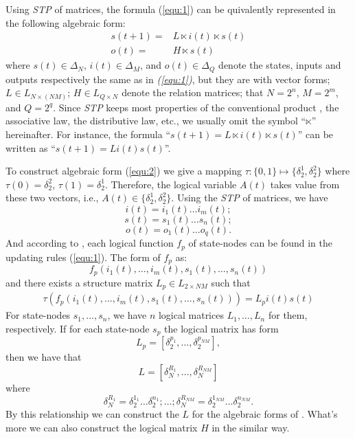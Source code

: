 Using {\em STP} of matrices, the formula (\ref{equ:1}) can be quivalently represented in the following algebraic form:
\begin{equation}
\begin{split}
s(t+1)=&L\ltimes{i(t)}\ltimes{s(t)}\\
o(t)=&H\ltimes{s(t)}
\end{split}
\label{equ:2}
\end{equation}
where $s(t)\in\Delta_N$, $i(t)\in\Delta_M$, and  $o(t)\in\Delta_Q$ denote the states, inputs and outputs respectively the same as in {\em (\ref{equ:1})}, but they are with vector forms; $L\in L_{N\times\left(NM\right)}$; $H\in L_{Q\times N}$ denote the relation matrices; that $N=2^n$, $M=2^m$, and $Q=2^q$. Since {\em STP} keeps most properties of the conventional product \cite{Cheng2011Analysis}, the associative law, the distributive law, etc., we usually omit the symbol ``$\ltimes$'' hereinafter. For instance, the 
formula ``$s(t+1)=L\ltimes{i(t)}\ltimes{s(t)}$'' can be written as ``$s(t+1)=L{i(t)}{s(t)}$''.

To construct algebraic form (\ref{equ:2}) we give a mapping $\tau:\{0,1\}\mapsto \{\delta_2^1, \delta_2^2\}$ where $\tau(0)=\delta_2^2$, $\tau(1)= \delta_2^1$. 
Therefore, the logical variable $A(t)$ takes value from these two vectors, i.e., $A(t)\in \{\delta_2^1, \delta_2^2\}$. Using the {\em STP} of matrices, we have 
\[i(t)=i_1(t){\ldots}i_m(t);\] 
\[s(t)=s_1(t){\ldots}s_n(t);\] 
\[o(t)=o_1(t){\ldots}o_q(t).\] 
And according to \cite{Cheng2003Semi}, each logical function $f_p$ of state-nodes can be found in the updating rules (\ref{equ:1}). The form of  $f_p$ as:
\[f_p(i_1(t),\ldots,i_m(t),s_1(t),\ldots,s_n(t))\] 
and there exists a structure matrix $L_p\in L_{2\times {NM}}$ such that
\begin{equation}
\begin{split}
\tau(f_p(i_1(t),\ldots,i_m(t),s_1(t),\ldots,s_n(t)))= L_pi(t)s(t)
\end{split}
\end{equation}
For state-nodes $s_1,\ldots,s_n$, we have $n$ logical matrices $L_1,\ldots,L_n$ for them, respectively. 
If for each state-node $s_p$ the logical matrix has form
\[L_p=[\delta_2^{p_1},\ldots,\delta_2^{p_{NM}}],\] 
then we have that %
\[L=[\delta_N^{R_1},\ldots,\delta_N^{R_{NM}}]\]  where 
\[\delta_N^{R_1}=\delta_2^{1_1}\ldots\delta_2^{n_1};\ldots; \delta_N^{R_{NM}}=\delta_2^{1_{NM}}\ldots\delta_2^{n_{NM}}.\] 
By this relationship we can construct the $L$ for the algebraic forms of \BCNs. What's more we can also construct the logical matrix $H$ in the similar way.

